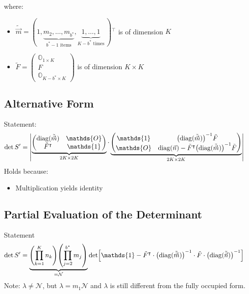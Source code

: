 \documentclass[
	english,
	a4paper,
	fontsize=10pt,
	parskip=half,
	titlepage=true,
	DIV=12,
	final
]{scrreprt}
\newcommand*{\transp}{\ensuremath{^\intercal}}
\DeclareMathOperator{\diag}{diag}
\begin{document}
where:
\begin{itemize}
\item $\tilde{\vec{m}} = (
	1,
	\underbrace{m_2, \ldots, m_{b^*}}_{b^* -1 \text{ items}},
	\underbrace{1, \ldots, 1}_{K - b^* \text{ times}}
	~)\transp$ is of dimension $K$
\item $\tilde{F} = \begin{pmatrix}
		\mathds{O}_{1 \times K} \\ 
		F \\ 
		\mathds{O}_{K - b^* \times K}
	\end{pmatrix}$
	is of dimension $K \times K$
\end{itemize}

\subsection{Alternative Form}
Statement:
\begin{align}
	\det S'
&=
	\mqty|
		\underbrace{\begin{pmatrix}
			\diag(\tilde{\vec{m}})	& \mathds{O}			\\
			\tilde{F}\transp			& \mathds{1}
		\end{pmatrix}}_{2K \times 2K}
		\cdot
		\underbrace{\begin{pmatrix}
			\mathds{1}	&	\qty(\diag(\tilde{\vec{m}}))^{-1} \tilde{F}		\\
			\mathds{O}	&	\diag(\vec{n}) - \tilde{F}\transp \qty(\diag(\tilde{\vec{m}}))^{-1}\tilde{F}
		\end{pmatrix}}_{2K \times 2K}
	|
	\label{eqn:detSProto}
\end{align}
Holds because:
\begin{itemize}
\item Multiplication yields identity
\end{itemize}

\subsection{Partial Evaluation of the Determinant}
Statement
\begin{align}
	\det S'
&=
	\underbrace{
		\qty( \prod_{k=1}^{K}   n_k )
		\qty( \prod_{j=2}^{b^*} m_j )
	}_{= \mathcal{N} }
	\det[
		\mathds{1} -
		\tilde{F}\transp \cdot \qty( \diag(\tilde{\vec{m}}) )^{-1}
		\cdot
		\tilde{F} \cdot \qty( \diag(\tilde{\vec{n}}) )^{-1}
	]
\label{eqn:detSPrimePartial}
\end{align}
Note: $\lambda \neq \mathcal{N}$, but $\lambda = m_1 \mathcal{N}$ {\color{red} and $\lambda$ is still different from the fully occupied form}.
\end{document}
